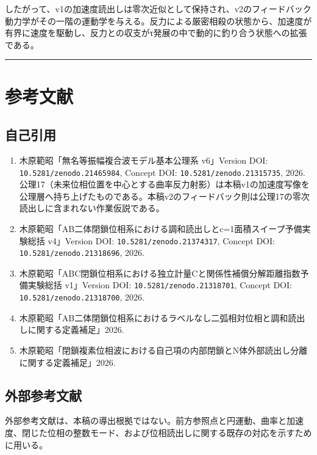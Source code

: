 \documentclass[
  a4paper,
]{ltjsarticle}
\providecommand{\tightlist}{%
  \setlength{\itemsep}{0pt}\setlength{\parskip}{0pt}}
\begin{document}
したがって、v1の加速度読出しは零次近似として保持され、v2のフィードバック動力学がその一階の運動学を与える。反力による厳密相殺の状態から、加速度が有界に速度を駆動し、反力との収支がτ発展の中で動的に釣り合う状態への拡張である。

\begin{center}\rule{0.5\linewidth}{0.5pt}\end{center}

\section{参考文献}\label{ux53c2ux8003ux6587ux732e}

\subsection{自己引用}\label{ux81eaux5df1ux5f15ux7528}

\begin{enumerate}
\def\labelenumi{\arabic{enumi}.}
\tightlist
\item
  木原範昭「無名等振幅複合波モデル基本公理系 v6」Version DOI:
  \texttt{10.5281/zenodo.21465984}, Concept DOI:
  \texttt{10.5281/zenodo.21315735}, 2026.
  公理17（未来位相位置を中心とする曲率反力射影）は本稿v1の加速度写像を公理層へ持ち上げたものである。本稿v2のフィードバック則は公理17の零次読出しに含まれない作業仮説である。
\item
  木原範昭「AB二体閉鎖位相系における調和読出しとc=1面積スイープ予備実験総括
  v4」Version DOI: \texttt{10.5281/zenodo.21374317}, Concept DOI:
  \texttt{10.5281/zenodo.21318696}, 2026.
\item
  木原範昭「ABC閉鎖位相系における独立計量Cと関係性補償分解距離指数予備実験総括
  v1」Version DOI: \texttt{10.5281/zenodo.21318701}, Concept DOI:
  \texttt{10.5281/zenodo.21318700}, 2026.
\item
  木原範昭「AB二体閉鎖位相系におけるラベルなし二弧相対位相と調和読出しに関する定義補足」2026.
\item
  木原範昭「閉鎖複素位相波における自己項の内部閉鎖とN体外部読出し分離に関する定義補足」2026.
\end{enumerate}

\subsection{外部参考文献}\label{ux5916ux90e8ux53c2ux8003ux6587ux732e}

外部参考文献は、本稿の導出根拠ではない。前方参照点と円運動、曲率と加速度、閉じた位相の整数モード、および位相読出しに関する既存の対応を示すために用いる。
\end{document}
